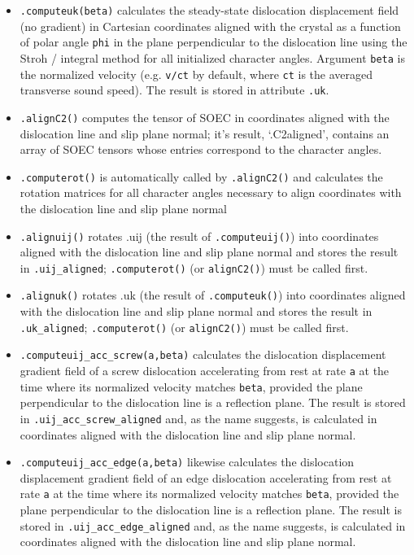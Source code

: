 \documentclass[11pt,letterpaper,oneside]{article}
\begin{document}
\begin{itemize}
\item \verb|.computeuk(beta)| calculates the steady-state dislocation displacement field (no gradient) in Cartesian coordinates aligned with the crystal as a function of polar angle \verb|phi| in the plane perpendicular to the dislocation line using the Stroh / integral method \cite{Bacon:1980} for all initialized character angles.
Argument \verb|beta| is the normalized velocity (e.g. \verb|v/ct| by default, where \verb|ct| is the averaged transverse sound speed).
The result is stored in attribute \verb|.uk|.

\item \verb|.alignC2()| computes the tensor of SOEC in coordinates aligned with the dislocation line and slip plane normal; it's result, `.C2aligned', contains an array of SOEC tensors whose entries correspond to the character angles.

\item \verb|.computerot()| is automatically called by \verb|.alignC2()| and calculates the rotation matrices for all character angles necessary to align coordinates with the dislocation line and slip plane normal

\item \verb|.alignuij()| rotates .uij (the result of \verb|.computeuij()|) into coordinates aligned with the dislocation line and slip plane normal and stores the result in \verb|.uij_aligned|; \verb|.computerot()| (or \verb|alignC2()|) must be called first.

\item \verb|.alignuk()| rotates .uk (the result of \verb|.computeuk()|) into coordinates aligned with the dislocation line and slip plane normal and stores the result in \verb|.uk_aligned|; \verb|.computerot()| (or \verb|alignC2()|) must be called first.

\item \verb|.computeuij_acc_screw(a,beta)| calculates the dislocation displacement gradient field of a screw dislocation accelerating from rest at rate \verb|a| at the time where its normalized velocity matches \verb|beta|, provided the plane perpendicular to the dislocation line is a reflection plane.
The result is stored in \verb|.uij_acc_screw_aligned| and, as the name suggests, is calculated in coordinates aligned with the dislocation line and slip plane normal.

\item \verb|.computeuij_acc_edge(a,beta)| likewise calculates the dislocation displacement gradient field of an edge dislocation accelerating from rest at rate \verb|a| at the time where its normalized velocity matches \verb|beta|, provided the plane perpendicular to the dislocation line is a reflection plane.
The result is stored in \verb|.uij_acc_edge_aligned| and, as the name suggests, is calculated in coordinates aligned with the dislocation line and slip plane normal.


\end{itemize}
\end{document}
